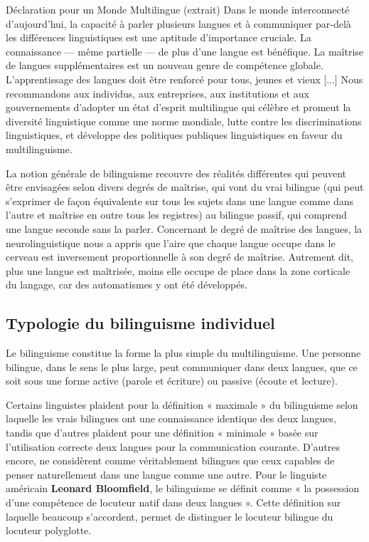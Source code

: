 \begin{lecture}{Déclaration pour un Monde Multilingue (extrait)}
Dans le monde interconnecté d’aujourd’hui, la capacité à parler plusieurs langues et à communiquer par-delà les différences linguistiques est une aptitude d’importance cruciale. La connaissance — même partielle — de plus d’une langue est bénéfique. La maîtrise de langues supplémentaires est un nouveau genre de compétence globale. L’apprentissage des langues doit être renforcé pour tous, jeunes et vieux [...] Nous recommandons aux individus, aux entreprises, aux institutions et aux gouvernements d’adopter un état d’esprit multilingue qui célèbre et promeut la diversité linguistique comme une norme mondiale, lutte contre les discriminations linguistiques, et développe des politiques publiques linguistiques en faveur du multilinguisme.
\end{lecture}

La notion générale de bilinguisme recouvre des réalités différentes qui peuvent être envisagées selon divers degrés de maîtrise, qui vont du vrai bilingue (qui peut s’exprimer de façon équivalente sur tous les sujets dans une langue comme dans l’autre et maîtrise en outre tous les registres) au bilingue passif, qui comprend une langue seconde sans la parler. Concernant le degré de maîtrise des langues, la neurolinguistique nous a appris que l’aire que chaque langue occupe dans le cerveau est inversement proportionnelle à son degré de maîtrise. Autrement dit, plus une langue est maîtrisée, moins elle occupe de place dans la zone corticale du langage, car des automatismes y ont été développés.

\subsection{Typologie du bilinguisme individuel}
Le bilinguisme constitue la forme la plus simple du multilinguisme. Une personne bilingue, dans le sens le plus large, peut communiquer dans deux langues, que ce soit sous une forme active (parole et écriture) ou passive (écoute et lecture).

Certains linguistes plaident pour la définition « maximale » du bilinguisme selon laquelle les vrais bilingues ont une connaissance identique des deux langues, tandis que d’autres plaident pour une définition « minimale » basée sur l’utilisation correcte deux langues pour la communication courante. D’autres encore, ne considèrent comme véritablement bilingues que ceux capables de penser naturellement dans une langue comme une autre. Pour le linguiste américain \textbf{Leonard Bloomfield}, le bilinguisme se définit comme « la possession d’une compétence de locuteur natif dans deux langues ». Cette définition sur laquelle beaucoup s’accordent, permet de distinguer le
locuteur bilingue du locuteur polyglotte.

